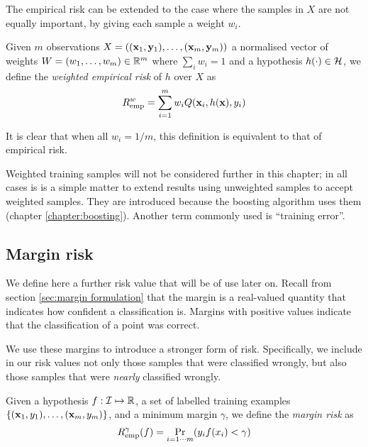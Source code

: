The empirical risk can be extended to the case where
the samples in $X$ are not equally important, by giving each sample a
weight $w_i$.

\begin{definition}
Given $m$ observations $X = ((\mathbf{x}_1, \mathbf{y}_1), \ldots, (\mathbf{x}_m,
\mathbf{y}_m))$ a normalised vector of weights $W = (w_1, \ldots, w_m) \in
\mathbb{R}^m$ where $\sum_{i} w_i = 1$ and a hypothesis $h(\cdot) \in
\mathcal{H}$, we define the \emph{weighted empirical risk} of $h$ over $X$ as 
%
\begin{equation}
R_{\mathrm{emp}}^w = \sum_{i=1}^{m} w_i Q(\mathbf{x}_i, h(\mathbf{x}), y_i)
\end{equation}
\end{definition}

It is clear that when all $w_i = 1/m$, this definition is equivalent
to that of empirical risk.

Weighted training samples will not be considered further in this
chapter; in all cases is is a simple matter to extend results using
unweighted samples to accept weighted samples.  They are introduced
because the boosting algorithm uses them (chapter
\ref{chapter:boosting}).  Another term commonly used is ``training
error''.


\subsection{Margin risk}
\label{sec:margin risk}

We define here a further risk value that will be of use later on.
Recall from section \ref{sec:margin formulation} that the margin is a
real-valued quantity that indicates how confident a classification
is.  Margins with positive values indicate that the classification of
a point was correct.

We use these margins to introduce a stronger form of risk.
Specifically, we include in our risk values not only those samples
that were classified wrongly, but also those samples that were
\emph{nearly} classified wrongly. 

\begin{definition}
Given a hypothesis $f : \mathcal{I} \mapsto \mathbb{R}$, a set of
labelled training examples $\{(\mathbf{x}_1, y_1), \ldots, (\mathbf{x}_m, y_m)\}$,
and a minimum margin $\gamma$, we define the \emph{margin risk} as
%
\begin{equation}
R^{\gamma}_{\mathrm{emp}}(f) = \Pr_{i=1\cdots m}(y_i f(x_i) < \gamma)
\end{equation}
\end{definition}

